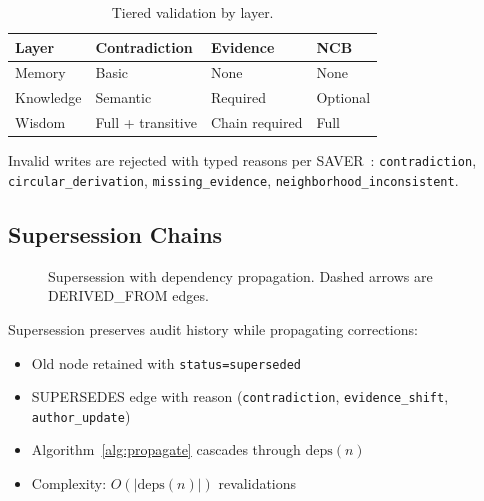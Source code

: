 \documentclass[11pt,letterpaper]{article}
\begin{document}
\begin{table}[H]
\centering
\caption{Tiered validation by layer.}
\label{tab:validation}
\begin{tabular}{@{}llll@{}}
\toprule
\textbf{Layer} & \textbf{Contradiction} & \textbf{Evidence} & \textbf{NCB} \\
\midrule
Memory & Basic & None & None \\
Knowledge & Semantic & Required & Optional \\
Wisdom & Full + transitive & Chain required & Full \\
\bottomrule
\end{tabular}
\end{table}

Invalid writes are rejected with typed reasons per SAVER~\cite{yuan2026saver}: \texttt{contradiction}, \texttt{circular\_derivation}, \texttt{missing\_evidence}, \texttt{neighborhood\_inconsistent}.

\subsection{Supersession Chains}

\begin{figure}[H]
\centering
{}
\caption{Supersession with dependency propagation. Dashed arrows are \textsf{DERIVED\_FROM} edges.}
\label{fig:supersession}
\end{figure}

Supersession preserves audit history while propagating corrections:
\begin{itemize}[noitemsep]
    \item Old node retained with \texttt{status=superseded}
    \item SUPERSEDES edge with reason (\texttt{contradiction}, \texttt{evidence\_shift}, \texttt{author\_update})
    \item Algorithm~\ref{alg:propagate} cascades through $\text{deps}(n)$
    \item Complexity: $O(|\text{deps}(n)|)$ revalidations
\end{itemize}
\end{document}
